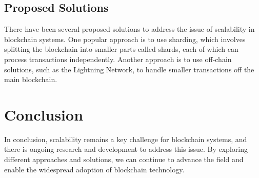 \documentclass{article}
\begin{document}
\subsection{Proposed Solutions}

There have been several proposed solutions to address the issue of scalability
in blockchain systems. One popular approach is to use sharding, which involves splitting
the blockchain into smaller parts called shards, each of which can process transactions independently. 
Another approach is to use off-chain solutions, such as the Lightning Network, 
to handle smaller transactions off the main blockchain.

\section{Conclusion}

In conclusion, scalability remains a key challenge for blockchain systems, 
and there is ongoing research and development to address this issue. 
By exploring different approaches and solutions, we can continue to advance 
the field and enable the widespread adoption of blockchain technology.
\end{document}
